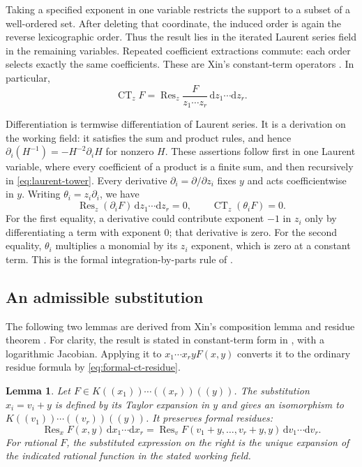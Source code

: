 \documentclass[reqno, 12pt]{article}
\numberwithin{equation}{section}
\newtheorem{lemma}[theorem]{Lemma}
\theoremstyle{definition}
\DeclareMathOperator{\CT}{CT}
\DeclareMathOperator{\Res}{Res}
\newcommand{\dd}{\mathrm d}
\begin{document}
Taking a specified exponent in one variable restricts the support
to a subset of a well-ordered set.  After deleting that coordinate,
the induced order is again the reverse lexicographic order.
Thus the result lies in the iterated Laurent series field in the
remaining variables.  Repeated coefficient extractions commute:
each order selects exactly the same coefficients.  These are Xin's constant-term operators
\cite[Definition~2-1.3 and properties~P1--P3, pp.~60--61]{XinThesis}.  In particular,
\begin{equation}\label{eq:formal-ct-residue}
\CT_z F
 =\Res_z\frac{F}{z_1\cdots z_r}\,\dd z_1\cdots\dd z_r.
\end{equation}

Differentiation is termwise differentiation of Laurent series.
It is a derivation on the working field: it satisfies the sum
and product rules, and hence
$\partial_i(H^{-1})=-H^{-2}\partial_iH$ for nonzero $H$.
These assertions follow first in one Laurent variable, where
every coefficient of a product is a finite sum, and then
recursively in \eqref{eq:laurent-tower}.  Every derivative $\partial_i=\partial/\partial z_i$ fixes
$y$ and acts coefficientwise in $y$.
Writing $\theta_i=z_i\partial_i$, we have
\begin{equation}\label{eq:formal-exact-residue}
\Res_z(\partial_iF)\,\dd z_1\cdots\dd z_r=0,
\qquad
\CT_z(\theta_iF)=0.
\end{equation}
For the first equality, a derivative could contribute exponent
$-1$ in $z_i$ only by differentiating a term with exponent $0$;
that derivative is zero.  For the second equality, $\theta_i$
multiplies a monomial by its $z_i$ exponent, which is zero at a
constant term.  This is the formal integration-by-parts rule of
\cite[Section~2-2, Rule~3, p.~66]{XinThesis}.


\subsection{An admissible substitution}


The following two lemmas are derived from Xin's composition lemma and residue theorem \cite[Lemma~3-2.6 and Theorem~3-2.7, pp.~123--125]{XinThesis}.
For clarity, the result is stated in constant-term form in \cite{XinThesis}, with a logarithmic Jacobian.  Applying it to
$x_1\cdots x_r yF(x,y)$ converts it to the ordinary residue formula by \eqref{eq:formal-ct-residue}.  


\begin{lemma}\label{lem:formal-translation}
Let $F\in K((x_1))\cdots((x_r))((y))$.  The substitution
$x_i=v_i+y$ is defined by its Taylor expansion in $y$ and gives
an isomorphism to $K((v_1))\cdots((v_r))((y))$.
It preserves formal residues:
\begin{equation*}
\Res_x F(x,y)\,\dd x_1\cdots\dd x_r=\Res_v F(v_1+y,\ldots,v_r+y,y)\,\dd v_1\cdots\dd v_r.
\end{equation*}
For rational $F$, the substituted expression on the right is the
unique expansion of the indicated rational function in the stated
working field.
\end{lemma}
\end{document}
